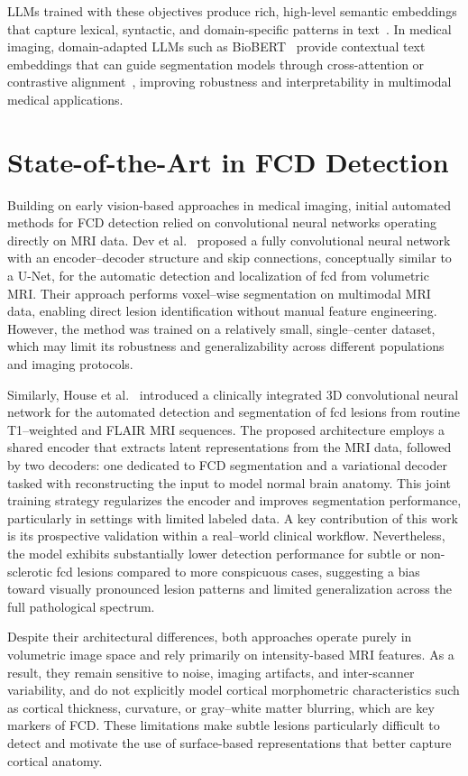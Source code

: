 \documentclass[FCD_GNN.tex]{subfiles}
\begin{document}
LLMs trained with these objectives produce rich, high-level semantic embeddings 
that capture lexical, syntactic, and domain-specific patterns in text~\cite{devlin2019bert}. 
In medical imaging, domain-adapted LLMs such as BioBERT~\cite{Lee2019BioBERT} 
provide contextual text embeddings that can guide segmentation models through 
cross-attention or contrastive alignment~\cite{Radford2021CLIP}, improving robustness and interpretability 
in multimodal medical applications.

\section{State-of-the-Art in FCD Detection}
Building on early vision-based approaches in medical imaging, initial automated methods for FCD detection relied on convolutional neural networks operating directly on MRI data.
Dev et al.~\cite{dev2019automatic_fcd} proposed a fully convolutional neural network with an encoder--decoder structure and skip connections, conceptually similar to a U-Net, for the automatic detection and localization of \ac{fcd} from volumetric MRI.
Their approach performs voxel--wise segmentation on multimodal MRI data, enabling direct lesion identification without manual feature engineering.
However, the method was trained on a relatively small, single--center dataset, which may limit its robustness and generalizability across different populations and imaging protocols.

Similarly, House et al.~\cite{house2021automated_fcd} introduced a clinically integrated 3D convolutional neural network for the automated detection and segmentation of \ac{fcd} lesions from routine T1--weighted and FLAIR MRI sequences.
The proposed architecture employs a shared encoder that extracts latent representations from the MRI data, followed by two decoders: one dedicated to FCD segmentation and a variational decoder tasked with reconstructing the input to model normal brain anatomy.
This joint training strategy regularizes the encoder and improves segmentation performance, particularly in settings with limited labeled data.
A key contribution of this work is its prospective validation within a real--world clinical workflow.
Nevertheless, the model exhibits substantially lower detection performance for subtle or non-sclerotic \ac{fcd} lesions compared to more conspicuous cases, suggesting a bias toward visually pronounced lesion patterns and limited generalization across the full pathological spectrum.

Despite their architectural differences, both approaches operate purely in volumetric image space and rely primarily on intensity-based MRI features.
As a result, they remain sensitive to noise, imaging artifacts, and inter-scanner variability, and do not explicitly model cortical morphometric characteristics such as cortical thickness, curvature, or gray--white matter blurring, which are key markers of FCD.
These limitations make subtle lesions particularly difficult to detect and motivate the use of surface-based representations that better capture cortical anatomy.
\end{document}
